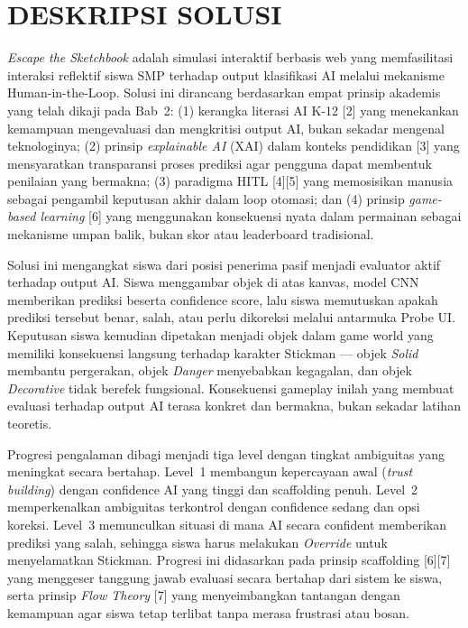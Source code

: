 \documentclass[12pt,oneside]{report}
\begin{document}
\section{DESKRIPSI SOLUSI}
\label{sec:deskripsi-solusi}

\textit{Escape the Sketchbook} adalah simulasi interaktif berbasis web yang memfasilitasi interaksi reflektif siswa SMP terhadap output klasifikasi AI melalui mekanisme Human-in-the-Loop. Solusi ini dirancang berdasarkan empat prinsip akademis yang telah dikaji pada Bab~2: (1) kerangka literasi AI K-12 [2] yang menekankan kemampuan mengevaluasi dan mengkritisi output AI, bukan sekadar mengenal teknologinya; (2) prinsip \textit{explainable AI} (XAI) dalam konteks pendidikan [3] yang mensyaratkan transparansi proses prediksi agar pengguna dapat membentuk penilaian yang bermakna; (3) paradigma HITL [4][5] yang memosisikan manusia sebagai pengambil keputusan akhir dalam loop otomasi; dan (4) prinsip \textit{game-based learning} [6] yang menggunakan konsekuensi nyata dalam permainan sebagai mekanisme umpan balik, bukan skor atau leaderboard tradisional.

Solusi ini mengangkat siswa dari posisi penerima pasif menjadi evaluator aktif terhadap output AI. Siswa menggambar objek di atas kanvas, model CNN memberikan prediksi beserta confidence score, lalu siswa memutuskan apakah prediksi tersebut benar, salah, atau perlu dikoreksi melalui antarmuka Probe UI. Keputusan siswa kemudian dipetakan menjadi objek dalam game world yang memiliki konsekuensi langsung terhadap karakter Stickman --- objek \textit{Solid} membantu pergerakan, objek \textit{Danger} menyebabkan kegagalan, dan objek \textit{Decorative} tidak berefek fungsional. Konsekuensi gameplay inilah yang membuat evaluasi terhadap output AI terasa konkret dan bermakna, bukan sekadar latihan teoretis.

Progresi pengalaman dibagi menjadi tiga level dengan tingkat ambiguitas yang meningkat secara bertahap. Level~1 membangun kepercayaan awal (\textit{trust building}) dengan confidence AI yang tinggi dan scaffolding penuh. Level~2 memperkenalkan ambiguitas terkontrol dengan confidence sedang dan opsi koreksi. Level~3 memunculkan situasi di mana AI secara confident memberikan prediksi yang salah, sehingga siswa harus melakukan \textit{Override} untuk menyelamatkan Stickman. Progresi ini didasarkan pada prinsip scaffolding [6][7] yang menggeser tanggung jawab evaluasi secara bertahap dari sistem ke siswa, serta prinsip \textit{Flow Theory} [7] yang menyeimbangkan tantangan dengan kemampuan agar siswa tetap terlibat tanpa merasa frustrasi atau bosan.
\end{document}
